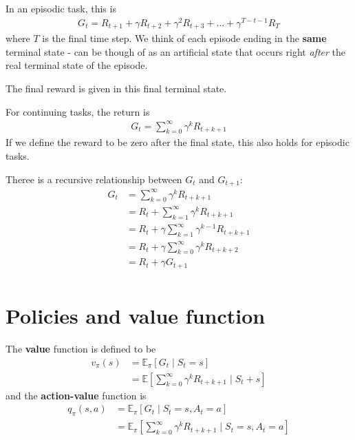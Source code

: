 \documentclass[a4paper,11pt,reqno]{amsart}
\begin{document}
In an episodic task, this is
\begin{align}
G_t = R_{t + 1} + \gamma R_{t + 2} + \gamma^{2} R_{t + 3} + \ldots + \gamma^{T  - t - 1} R_T
\end{align}
where $T$ is the final time step. We think of each episode ending in the \textbf{same} terminal state - can be though of as an artificial state that occurs right \emph{after} the real terminal state of the episode. 

The final reward is given in this final terminal state. 

For continuing tasks, the return is
\begin{align}
G_t = \sum_{k=0}^{\infty} \gamma ^{k}R_{t + k + 1}
\end{align}
If we define the reward to be zero after the final state, this also holds for episodic tasks.

Theree is a recursive relationship between $G_t$ and $G_{t + 1}$: 
\begin{align}
    G_t &= \sum_{k=0}^{\infty} \gamma ^{k}R_{t + k + 1}\\
&= R_t + \sum_{k=1}^{\infty} \gamma ^{k}R_{t + k + 1} \\
&= R_t + \gamma \sum_{k=1}^{\infty} \gamma ^{k - 1}R_{t + k + 1} \\
&= R_t + \gamma \sum_{k=0}^{\infty}\gamma ^{k} R_{t + k + 2} \\
&= R_t + \gamma G_{t + 1} \\
\end{align}

\section*{Policies and value function}
The \textbf{value} function is defined to be
\begin{align}
    v_{\pi }(s) &= \mathbb{E}_\pi \left[ G_t \mid S_t = s \right]\\  
    &= \mathbb{E}\left[ \sum_{k=0}^{\infty} \gamma ^{k}R_{t+k+1} \;\Bigg | \;  S_t + s \right] 
\end{align}
and the \textbf{action-value} function is
\begin{align}
q_\pi (s, a) &= \mathbb{E}_\pi \left[ G_t \mid S_t = s, A_t = a \right]  \\
&= \mathbb{E}_\pi \left[ \sum_{k=0}^{\infty} \gamma ^{k}R_{t + k + 1} \;\Bigg | \; S_t = s, A_t = a \right]  \\
\end{align}
\end{document}
